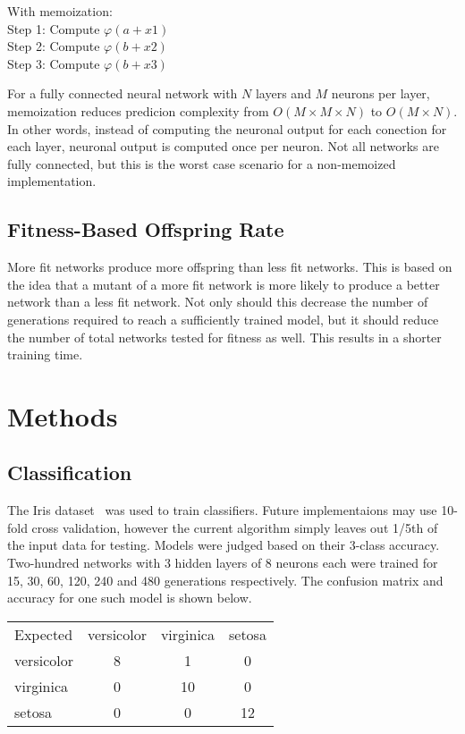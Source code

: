 \documentclass[twocolumn]{article}
\begin{document}
\noindent With memoization: \\
\indent Step 1: Compute $\varphi(a+x1)$ \\
\indent Step 2: Compute $\varphi(b+x2)$ \\
\indent Step 3: Compute $\varphi(b+x3)$

For a fully connected neural network with $N$ layers and $M$ neurons per layer, memoization reduces predicion complexity from $O(M \times M \times N)$ to $O(M \times N)$. In other words, instead of computing the neuronal output for each conection for each layer, neuronal output is computed once per neuron. Not all networks are fully connected, but this is the worst case scenario for a non-memoized implementation. 

\subsection{Fitness-Based Offspring Rate}

More fit networks produce more offspring than less fit networks. This is based on the idea that a mutant of a more fit network is more likely to produce a better network than a less fit network. Not only should this decrease the number of generations required to reach a sufficiently trained model, but it should reduce the number of total networks tested for fitness as well. This results in a shorter training time.

\section{Methods}
\subsection{Classification}

The Iris dataset~\cite{IrisDataset} was used to train classifiers. Future implementaions may use 10-fold cross validation, however the current algorithm simply leaves out 1/5th of the input data for testing. Models were judged based on their 3-class accuracy. Two-hundred networks with 3 hidden layers of 8 neurons each were trained for 15, 30, 60, 120, 240 and 480 generations respectively. The confusion matrix and accuracy for one such model is shown below.

\begin{center}
\begin{tabular}{ l c c c }
Expected & versicolor & virginica & setosa \\
versicolor & 8 & 1 & 0 \\ 
virginica & 0 & 10 & 0 \\
setosa & 0 & 0 & 12
\end{tabular}
\end{center}
\end{document}
